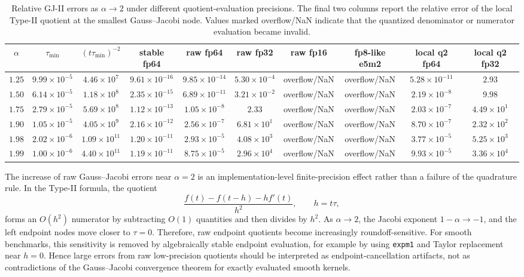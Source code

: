 \begin{table}[htbp]
\centering
\caption{Relative GJ-II errors as $\alpha\to2$ under different quotient-evaluation precisions.  The final two columns report the relative error of the local Type-II quotient at the smallest Gauss--Jacobi node.  Values marked overflow/NaN indicate that the quantized denominator or numerator evaluation became invalid.}
\label{tab:valid-alpha2-precision}
\begin{tabular}{c|cc|ccccc|cc}
\hline
$\alpha$ & $\tau_{\min}$ & $(t\tau_{\min})^{-2}$ & stable fp64 & raw fp64 & raw fp32 & raw fp16 & fp8-like e5m2 & local q2 fp64 & local q2 fp32 \\
\hline
$1.25$ & $9.99\times10^{-5}$ & $4.46\times10^{7}$  & $9.61\times10^{-16}$ & $9.85\times10^{-14}$ & $5.30\times10^{-4}$ & overflow/NaN & overflow/NaN & $5.28\times10^{-11}$ & $2.93$ \\
$1.50$ & $6.14\times10^{-5}$ & $1.18\times10^{8}$  & $2.35\times10^{-15}$ & $6.89\times10^{-11}$ & $3.21\times10^{-2}$ & overflow/NaN & overflow/NaN & $2.19\times10^{-8}$  & $9.98$ \\
$1.75$ & $2.79\times10^{-5}$ & $5.69\times10^{8}$  & $1.12\times10^{-13}$ & $1.05\times10^{-8}$  & $2.33$              & overflow/NaN & overflow/NaN & $2.03\times10^{-7}$  & $4.49\times10^{1}$ \\
$1.90$ & $1.05\times10^{-5}$ & $4.05\times10^{9}$  & $2.16\times10^{-12}$ & $2.56\times10^{-7}$  & $6.81\times10^{1}$ & overflow/NaN & overflow/NaN & $8.70\times10^{-7}$  & $2.32\times10^{2}$ \\
$1.98$ & $2.02\times10^{-6}$ & $1.09\times10^{11}$ & $1.20\times10^{-11}$ & $2.93\times10^{-5}$  & $4.08\times10^{3}$ & overflow/NaN & overflow/NaN & $3.77\times10^{-5}$  & $5.25\times10^{3}$ \\
$1.99$ & $1.00\times10^{-6}$ & $4.40\times10^{11}$ & $1.19\times10^{-11}$ & $8.75\times10^{-5}$  & $2.96\times10^{4}$ & overflow/NaN & overflow/NaN & $9.93\times10^{-5}$  & $3.36\times10^{4}$ \\
\hline
\end{tabular}
\end{table}

\begin{remark}[Raw Gauss--Jacobi quotients near $\alpha=2$]
The increase of raw Gauss--Jacobi errors near $\alpha=2$ is an implementation-level finite-precision effect rather than a failure of the quadrature rule.  In the Type-II formula, the quotient
\[
    \frac{f(t)-f(t-h)-h f'(t)}{h^2},\qquad h=t\tau,
\]
forms an $O(h^2)$ numerator by subtracting $O(1)$ quantities and then divides by $h^2$.  As $\alpha\to2$, the Jacobi exponent $1-\alpha\to-1$, and the left endpoint nodes move closer to $\tau=0$.  Therefore, raw endpoint quotients become increasingly roundoff-sensitive.  For smooth benchmarks, this sensitivity is removed by algebraically stable endpoint evaluation, for example by using \texttt{expm1} and Taylor replacement near $h=0$.  Hence large errors from raw low-precision quotients should be interpreted as endpoint-cancellation artifacts, not as contradictions of the Gauss--Jacobi convergence theorem for exactly evaluated smooth kernels.
\end{remark}
